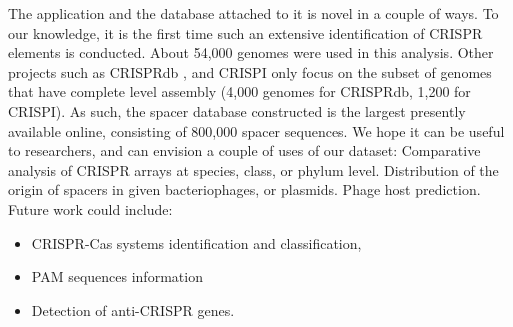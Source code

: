 \documentclass[11pt, a4paper,titlepage]{article}
\begin{document}
The application and the database attached to it is novel in a couple
of ways. To our knowledge, it is the first time such an extensive
identification of CRISPR elements is conducted. About 54,000 genomes
were used in this analysis. Other projects such as CRISPRdb \cite{grissa2007crisprdb}, and
CRISPI \cite{rousseau2009crispi} only focus on the subset of genomes that have complete
level assembly (4,000 genomes for CRISPRdb, 1,200 for CRISPI). As
such, the spacer database constructed is the largest presently
available online, consisting of 800,000 spacer sequences. We hope it
can be useful to researchers, and can envision a couple of uses of our
dataset: Comparative analysis of CRISPR arrays at species, class, or
phylum level.  Distribution of the origin of spacers in given
bacteriophages, or plasmids.  Phage host prediction.  Future work
could include:

\begin{itemize}
\item CRISPR-Cas systems identification and classification,
\item PAM sequences information
\item Detection of anti-CRISPR genes. 
\end{itemize}

\newpage
 

\end{document}
